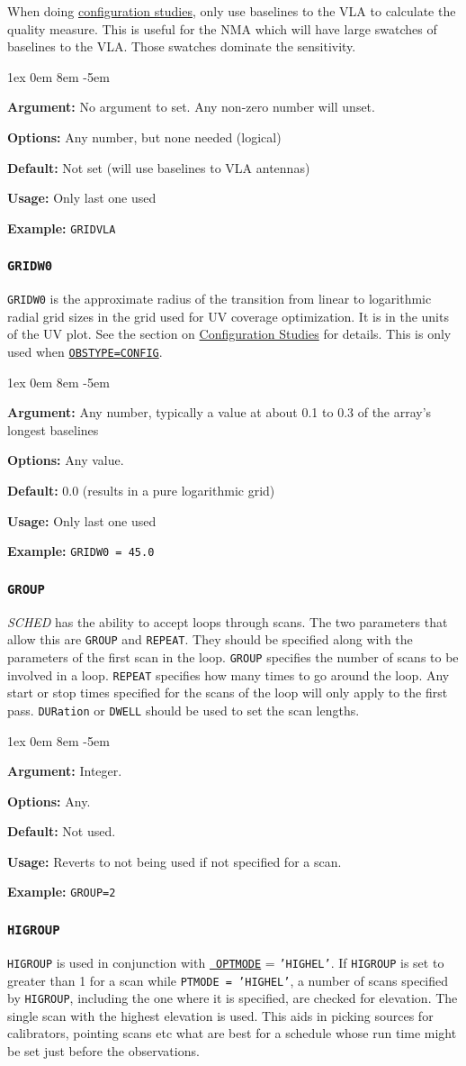 \documentclass{report}
\newcommand{\rcwbox}[5]{
  \begin{list}{}{\parsep 1ex  \itemsep 0em
                 \leftmargin 8em  \itemindent -5em }
    \item {\bf Argument:} #1
    \item {\bf Options:}  #2
    \item {\bf Default:}  #3
    \item {\bf Usage:}    #4
    \item {\bf Example:}  #5
  \end{list}
}
\begin{document}
When doing 
{\hyperref[SEC:CONFIG]{configuration studies}}, only use baselines
to the VLA to calculate the quality measure.  This is useful for the NMA
which will have large swatches of baselines to the VLA.  Those swatches
dominate the sensitivity.

\rcwbox
{No argument to set.  Any non-zero number will unset.}
{Any number, but none needed (logical)}
{Not set (will use baselines to VLA antennas)}
{Only last one used}
{{\tt GRIDVLA}}

\subsubsection{\label{MP:GRIDW0}{\tt GRIDW0}}

{\tt GRIDW0} is the approximate radius of the transition
from linear to logarithmic radial grid sizes in the grid used for UV
coverage optimization.  It is in the units of the UV plot.
See the section on 
{\hyperref[SEC:CONFIG]{Configuration Studies}}
for details.  This is only used when
{\hyperref[MP:OBSTYPE]{{\tt OBSTYPE=CONFIG}}}.

\rcwbox
{Any number, typically a value at about 0.1 to 0.3 of the array's longest
baselines}
{Any value.}
{0.0 (results in a pure logarithmic grid)}
{Only last one used}
{{\tt GRIDW0 = 45.0}}


\subsubsection{\label{MP:GROUP}{\tt GROUP}}

{\em SCHED} has the ability to accept loops through scans.  The two
parameters that allow this are {\tt GROUP} and {\tt REPEAT}.  They
should be specified along with the parameters of the first scan in the
loop.  {\tt GROUP} specifies the number of scans to be involved in a
loop.  {\tt REPEAT} specifies how many times to go around the loop.
Any start or stop times specified for the scans of the loop will
only apply to the first pass.  {\tt DURation} or {\tt DWELL} should
be used to set the scan lengths.

\rcwbox
{Integer.}
{Any.}
{Not used.}
{Reverts to not being used if not specified for a scan.}
{{\tt GROUP=2}}

\subsubsection{\label{MP:HIGROUP}{\tt HIGROUP}}

{\tt HIGROUP} is used in conjunction with {\hyperref[MP:OPTMODE]{{\tt
OPTMODE}}} = {\tt 'HIGHEL'}.  If {\tt HIGROUP} is set to greater than
1 for a scan while {\tt PTMODE = 'HIGHEL'}, a number of scans specified by
{\tt HIGROUP}, including the one where it is specified, are checked for
elevation.  The single scan with the highest elevation is used.  This
aids in picking sources for calibrators, pointing scans etc what are 
best for a schedule whose run time might be set just before the observations.
\end{document}
